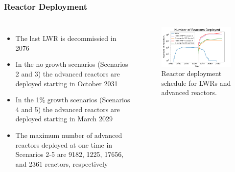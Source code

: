 \begin{frame}
    \frametitle{Reactor Deployment}
    \begin{columns}
        \column[t]{5cm}
        \begin{itemize}
            \item The last \gls{LWR} is decommissied in 2076
            \item In the no growth scenarios (Scenarios 2 and 3) the advanced reactors are 
                  deployed starting in October 2031
            \item In the 1\% growth scenarios (Scenarios 4 and 5) the advanced reactors are 
                  deployed starting in March 2029
            \item The maximum number of advanced reactors deployed at one time 
                  in Scenarios 2-5 are 9182, 1225, 17656, and 2361 reactors, respectively
        \end{itemize}

        \column[t]{5cm}
        \vspace{-1cm}
        \begin{figure}
            \centering 
            \includegraphics[scale=0.3]{figures/rxdeployment_scenarios_all.png}
            \caption{Reactor deployment schedule for \glspl{LWR} and 
            advanced reactors.}
            \label{fig:rx_deployment}
        \end{figure}
    \end{columns}
\end{frame}


